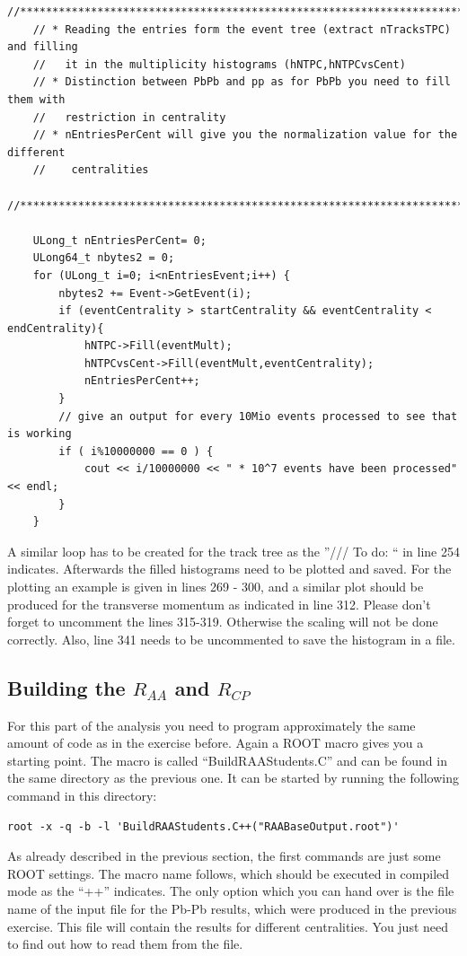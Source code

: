 \documentclass{article}
\begin{document}
\begin{lstlisting}[firstnumber=219]
 	//*********************************************************************************
	// * Reading the entries form the event tree (extract nTracksTPC) and filling 
	//   it in the multiplicity histograms (hNTPC,hNTPCvsCent)
	// * Distinction between PbPb and pp as for PbPb you need to fill them with 
	//   restriction in centrality
	// * nEntriesPerCent will give you the normalization value for the different 
	//	  centralities
	//*********************************************************************************

	ULong_t nEntriesPerCent= 0;
	ULong64_t nbytes2 = 0;
	for (ULong_t i=0; i<nEntriesEvent;i++) {
		nbytes2 += Event->GetEvent(i);
		if (eventCentrality > startCentrality && eventCentrality < endCentrality){
			hNTPC->Fill(eventMult);
			hNTPCvsCent->Fill(eventMult,eventCentrality);
			nEntriesPerCent++;
		}
		// give an output for every 10Mio events processed to see that is working 
		if ( i%10000000 == 0 ) {
			cout << i/10000000 << " * 10^7 events have been processed" << endl;
		}
	}
\end{lstlisting}

A similar loop has to be created for the track tree as the ''/// To do: `` in 
line 254 indicates. Afterwards the filled histograms need to be plotted and 
saved. For the plotting an example is given in lines 269 - 300, and a similar 
plot should be produced for the transverse momentum as indicated in line 312. 
Please don't forget to uncomment the lines 315-319. Otherwise the scaling will 
not be done correctly. Also, line 341 needs to be uncommented to save the 
histogram in a file. 

\subsection{Building the $R_{AA}$ and $R_{CP}$}
For this part of the analysis you need to program approximately the same amount
of code as in the exercise before. Again a ROOT macro gives you a starting
point. The macro is called ``BuildRAAStudents.C'' and can be found in the same 
directory as the previous one. It can be started by running the following 
command in this directory:

\begin{lstlisting}[]
root -x -q -b -l 'BuildRAAStudents.C++("RAABaseOutput.root")'
\end{lstlisting}

As already described in the previous section, the first commands are just some 
ROOT settings. The macro name follows, which should be executed in compiled 
mode as the ``++'' indicates. The only option which you can hand over is the 
file name of the input file for the Pb-Pb results, which were produced in the 
previous exercise. This file will contain the results for different 
centralities. You just need to find out how to read them from the file.
\end{document}
